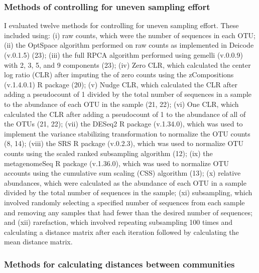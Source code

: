 \documentclass[
  11pt,
]{article}
\begin{document}
\subsubsection{Methods of controlling for uneven sampling
effort}\label{methods-of-controlling-for-uneven-sampling-effort}

I evaluated twelve methods for controlling for uneven sampling effort.
These included using: (i) raw counts, which were the number of sequences
in each OTU; (ii) the OptSpace algorithm performed on raw counts as
implemented in Deicode (v.0.1.5) (23); (iii) the full RPCA algorithm
performed using gemelli (v.0.0.9) with 2, 3, 5, and 9 components (23);
(iv) Zero CLR, which calculated the center log ratio (CLR) after
imputing the of zero counts using the zCompositions (v.1.4.0.1) R
package (20); (v) Nudge CLR, which calculated the CLR after adding a
pseudocount of 1 divided by the total number of sequences in a sample to
the abundance of each OTU in the sample (21, 22); (vi) One CLR, which
calculated the CLR after adding a pseudocount of 1 to the abundance of
all of the OTUs (21, 22); (vii) the DESeq2 R package (v.1.34.0), which
was used to implement the variance stabilizing transformation to
normalize the OTU counts (8, 14); (viii) the SRS R package (v.0.2.3),
which was used to normalize OTU counts using the scaled ranked
subsampling algorithm (12); (ix) the metagenomeSeq R package (v.1.36.0),
which was used to normalize OTU accounts using the cumulative sum
scaling (CSS) algorithm (13); (x) relative abundances, which were
calculated as the abundance of each OTU in a sample divided by the total
number of sequences in the sample; (xi) subsampling, which involved
randomly selecting a specified number of sequences from each sample and
removing any samples that had fewer than the desired number of
sequences; and (xii) rarefaction, which involved repeating subsampling
100 times and calculating a distance matrix after each iteration
followed by calculating the mean distance matrix.

\subsubsection{Methods for calculating distances between
communities}\label{methods-for-calculating-distances-between-communities}
\end{document}
